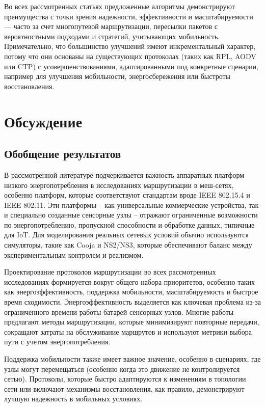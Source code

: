 \documentclass[%
]{report}
\begin{document}
Во всех рассмотренных статьях предложенные
алгоритмы демонстрируют
преимущества с точки зрения надежности,
эффективности и масштабируемости ---
часто за счет многопутевой маршрутизации,
пересылки пакетов с вероятностными подходами
и стратегий, учитывающих мобильность.
Примечательно, что большинство
улучшений имеют инкрементальный характер,
потому что они основаны на существующих протоколах
(таких как RPL, AODV или CTP)
с усовершенствованиями, адаптированными под конкретные сценарии,
например для улучшения мобильности,
энергосбережения или быстроты восстановления.

\section{Обсуждение}\label{discussion}

\subsection{Обобщение результатов}\label{summary-of-evidence}

В рассмотренной литературе подчеркивается важность
аппаратных платформ низкого энергопотребления в
исследованиях маршрутизации в меш-сетях,
особенно платформ, которые соответствуют стандартам вроде
IEEE 802.15.4 и IEEE 802.11.
Эти платформы -- как универсальные коммерческие устройства,
так и специально созданные сенсорные узлы --
отражают ограниченные возможности по энергопотреблению,
пропускной способности и обработке данных,
типичные для IoT.
Для моделирования реальных сетевых условий обычно
используются симуляторы,
такие как Cooja и NS2/NS3, которые обеспечивают
баланс между экспериментальным контролем и реализмом.

Проектирование протоколов маршрутизации
во всех рассмотренных исследованиях формируется
вокруг общего набора приоритетов, особенно таких
как энергоэффективность, поддержка мобильности,
масштабируемость и быстрое время сходимости.
Энергоэффективность выделяется как ключевая проблема
из-за ограниченного времени работы батарей
сенсорных узлов. Многие работы предлагают
методы маршрутизации, которые минимизируют
повторные передачи, сокращают затраты на
обслуживание маршрутов и используют метрики выбора
пути с учетом энергопотребления.

Поддержка мобильности также имеет важное значение,
особенно в сценариях, где узлы могут перемещаться 
(особенно когда это движение не контролируется сетью).
Протоколы, которые быстро адаптируются к изменениям в
топологии сети или включают механизмы восстановления,
как правило, демонстрируют лучшую надежность в мобильных условиях.
\end{document}
